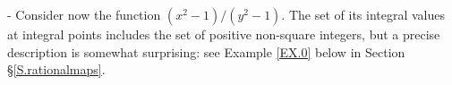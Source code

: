 \documentclass[leqno,12pt]{article} %
\def\Z{{{\mathbb Z}}}
\theoremstyle{plain} %
\theoremstyle{definition} %
\begin{document}
- Consider now the function 
$ 
(x^2-1)/(y^2-1). 
$
 The set of its integral values at integral points includes  the set of positive non-square integers, but a precise description is somewhat surprising: see Example \ref{EX.0} below in Section \S \ref{S.rationalmaps}. %

  
  
  
  
  
  
  
 
\end{document}

